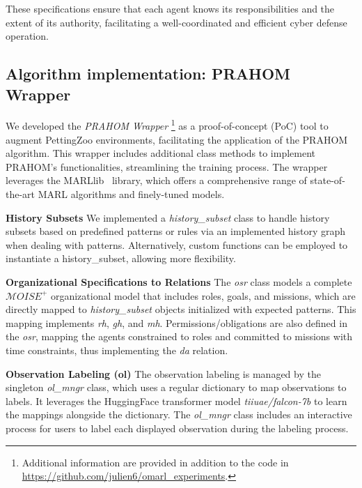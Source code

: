 \documentclass[conference]{IEEEtran}
\newcounter{relation}
\begin{document}
These specifications ensure that each agent knows its responsibilities and the extent of its authority, facilitating a well-coordinated and efficient cyber defense operation.




\subsection{Algorithm implementation: PRAHOM Wrapper}

We developed the \textit{PRAHOM Wrapper}
%
\footnote{Additional information are provided in addition to the code in \url{https://github.com/julien6/omarl_experiments}.}
%
as a proof-of-concept (PoC) tool to augment PettingZoo environments, facilitating the application of the PRAHOM algorithm. This wrapper includes additional class methods to implement PRAHOM's functionalities, streamlining the training process. The wrapper leverages the MARLlib~\cite{hu2022marllib} library, which offers a comprehensive range of state-of-the-art MARL algorithms and finely-tuned models.

\textbf{History Subsets} \quad We implemented a \textit{history\_subset} class to handle history subsets based on predefined patterns or rules via an implemented history graph when dealing with patterns. Alternatively, custom functions can be employed to instantiate a history\_subset, allowing more flexibility.

\textbf{Organizational Specifications to Relations} \quad The \textit{osr} class models a complete $\mathcal{M}OISE^+$ organizational model that includes roles, goals, and missions, which are directly mapped to \textit{history\_subset} objects initialized with expected patterns. This mapping implements \textit{rh}, \textit{gh}, and \textit{mh}. Permissions/obligations are also defined in the \textit{osr}, mapping the agents constrained to roles and committed to missions with time constraints, thus implementing the \textit{da} relation.

\textbf{Observation Labeling (ol)} \quad The observation labeling is managed by the singleton \textit{ol\_mngr} class, which uses a regular dictionary to map observations to labels. It leverages the HuggingFace transformer model \textit{tiiuae/falcon-7b} to learn the mappings alongside the dictionary. The \textit{ol\_mngr} class includes an interactive process for users to label each displayed observation during the labeling process. %
\end{document}
